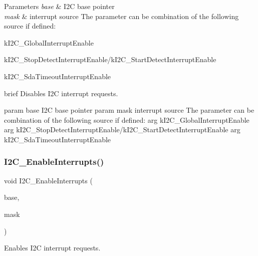 \begin{DoxyParams}{Parameters}
{\em base} & I2C base pointer \\
\hline
{\em mask} & interrupt source The parameter can be combination of the following source if defined\+: \begin{DoxyItemize}
\item k\+I2\+C\+\_\+\+Global\+Interrupt\+Enable \item k\+I2\+C\+\_\+\+Stop\+Detect\+Interrupt\+Enable/k\+I2\+C\+\_\+\+Start\+Detect\+Interrupt\+Enable \item k\+I2\+C\+\_\+\+Sda\+Timeout\+Interrupt\+Enable\end{DoxyItemize}
brief Disables I2C interrupt requests.\\
\hline
\end{DoxyParams}
param base I2C base pointer param mask interrupt source The parameter can be combination of the following source if defined\+: arg k\+I2\+C\+\_\+\+Global\+Interrupt\+Enable arg k\+I2\+C\+\_\+\+Stop\+Detect\+Interrupt\+Enable/k\+I2\+C\+\_\+\+Start\+Detect\+Interrupt\+Enable arg k\+I2\+C\+\_\+\+Sda\+Timeout\+Interrupt\+Enable \mbox{\label{group__i2c__driver_ga577e094cc4d39b88ec5bbe49bc199c77}} 
\subsubsection{\texorpdfstring{I2C\_EnableInterrupts()}{I2C\_EnableInterrupts()}}
{\footnotesize\ttfamily void I2\+C\+\_\+\+Enable\+Interrupts (\begin{DoxyParamCaption}\item[{\mbox{\hyperlink{struct_i2_c___type}{I2\+C\+\_\+\+Type}} $\ast$}]{base,  }\item[{uint32\+\_\+t}]{mask }\end{DoxyParamCaption})}



Enables I2C interrupt requests. 


